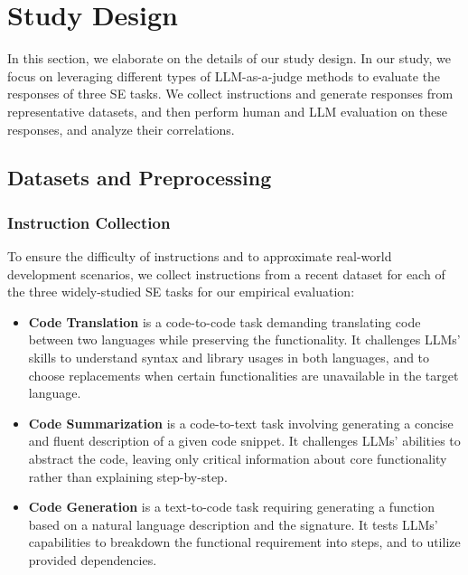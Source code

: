 \section{Study Design\label{experiment}}
In this section, we elaborate on the details of our study design. In our study, we focus on leveraging different types of LLM-as-a-judge methods to evaluate the responses of three SE tasks. We collect instructions and generate responses from representative datasets, and then perform human and LLM evaluation on these responses, and analyze their correlations.

\subsection{Datasets and Preprocessing}
\subsubsection{Instruction Collection}
To ensure the difficulty of instructions and to approximate real-world development scenarios, we collect instructions from a recent dataset for each of the three widely-studied SE tasks for our empirical evaluation:

\begin{itemize}
    \item \textbf{Code Translation} is a code-to-code task demanding translating code between two languages while preserving the functionality. It challenges LLMs' skills to understand syntax and library usages in both languages, and to choose replacements when certain functionalities are unavailable in the target language.

    \item \textbf{Code Summarization} is a code-to-text task involving generating a concise and fluent description of a given code snippet. It challenges LLMs' abilities to abstract the code, leaving only critical information about core functionality rather than explaining step-by-step.

    \item \textbf{Code Generation} is a text-to-code task requiring generating a function based on a natural language description and the signature. It tests LLMs' capabilities to breakdown the functional requirement into steps, and to utilize provided dependencies.
\end{itemize}

